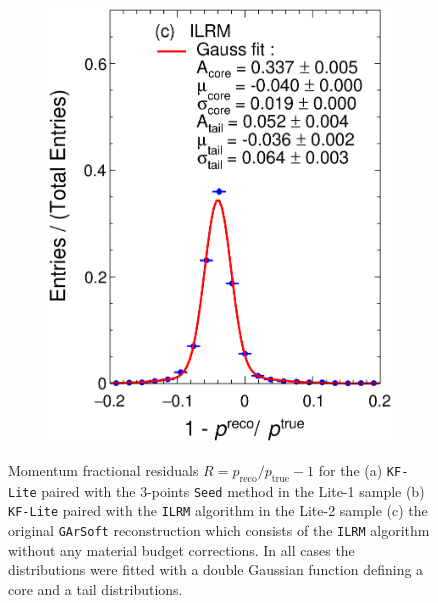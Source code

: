 \begin{figure}[t]
\begin{subfigure}{0.32\textwidth}
         \includegraphics[width=\textwidth]{figures/ch4-KF_NDGArLite/MC/ILRM+KF/pResILRM_doublegauss.eps}
         \caption{}
         \label{fig:respKF_GArLite_ILRM}
     \end{subfigure}
        \caption[Momentum fractional residuals for the \texttt{KF-Lite} in the Lite-1 and Lite-2 sample compared with the old reconstruction.]{Momentum fractional residuals $R=p_{\text{reco}}/p_{\text{true}} - 1$ for the (a) \texttt{KF-Lite} paired with the 3-points \texttt{Seed} method in the Lite-1 sample (b) \texttt{KF-Lite} paired with the \texttt{ILRM} algorithm in the Lite-2 sample (c) the original \texttt{GArSoft} reconstruction which consists of the \texttt{ILRM} algorithm without any material budget corrections. In all cases the distributions were fitted with a double Gaussian function defining a core and a tail distributions.} 
        \label{fig:MCpResComparison}
\end{figure}

